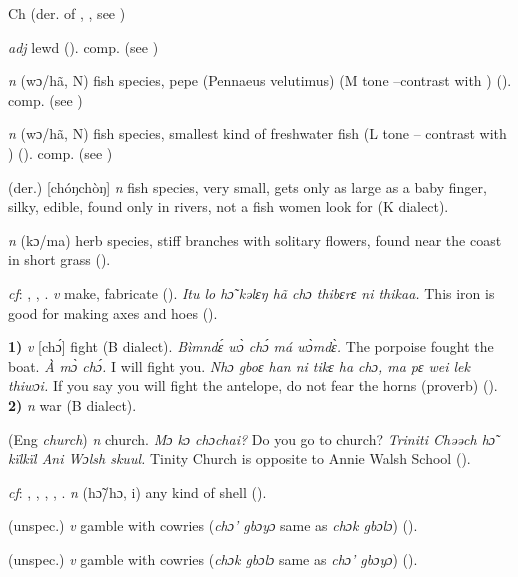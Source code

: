 \begin{letter}{Ch}
 (der. of , , see ) 

 \textit{adj} lewd (\citealt{Pichl1967}). comp.  (see )

 \textit{n} (wɔ/hã, N) fish species, pepe (Pennaeus velutimus) (M tone --contrast with ) (\citealt{Pichl1967}). comp.  (see ) 

 \textit{n} (wɔ/hã, N) fish species, smallest kind of freshwater fish (L tone -- contrast with ) (\citealt{Pichl1967}). comp.  (see ) 

 (der.) [chóŋchòŋ] \textit{n} fish species, very small, gets only as large as a baby finger, silky, edible, found only in rivers, not a fish women look for (K dialect). 

 \textit{n} (kɔ/ma) herb species, stiff branches with solitary flowers, found near the coast in short grass (\citealt{Pichl1967}).

 \textit{cf}: , , . \textit{v} make, fabricate (\citealt{Pichl1967}). \textit{Itu lo hɔ̃ kəlɛŋ hã chɔ thibɛrɛ ni thikaa.} This iron is good for making axes and hoes (\citealt{Pichl1967}).

 \textbf{1)} \textit{v} [chɔ́] fight (B dialect). \textit{Bìmndɛ́ wɔ̀ chɔ́ má wɔ̀mdɛ̀.} The porpoise fought the boat. \textit{À mɔ̀ chɔ́.} I will fight you. \textit{Nhɔ gboɛ han ni tikɛ ha chɔ, ma pɛ wei lek thiwɔi.} If you say you will fight the antelope, do not fear the horns (proverb) (\citealt{TISLL1979}). \textbf{2)} \textit{n} war (B dialect).

 (Eng \textit{church}) \textit{n} church. \textit{Mɔ kɔ chɔchai?} Do you go to church? \textit{Triniti Chəəch hɔ̃ kïlkïl Ani Wɔlsh skuul.} Tinity Church is opposite to Annie Walsh School (\citealt{Pichl1967}). 

 \textit{cf}: , , , , . \textit{n} (hɔ̃/hɔ, i) any kind of shell (\citealt{Pichl1967}).

 (unspec.) \textit{v} gamble with cowries (\textit{chɔ' gbɔyɔ} same as \textit{chɔk gbɔlɔ}) (\citealt{Pichl1967}).

 (unspec.) \textit{v} gamble with cowries (\textit{chɔk gbɔlɔ} same as \textit{chɔ' gbɔyɔ}) (\citealt{Pichl1967}).


\end{letter}
